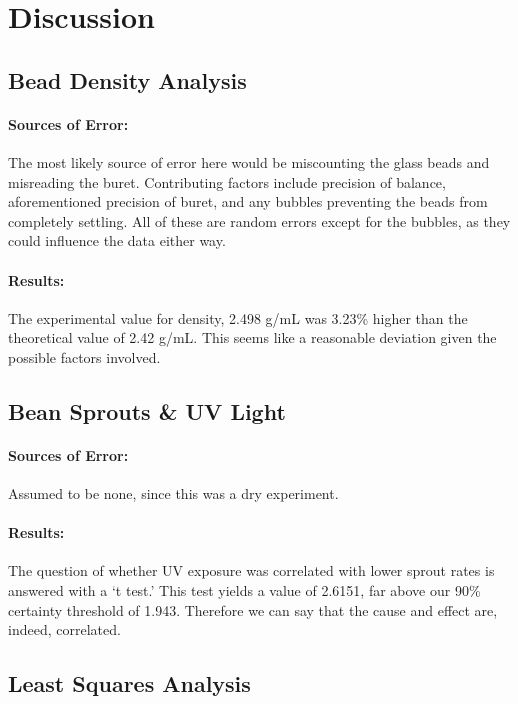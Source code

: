 \documentclass{article}
\begin{document}
\newpage

\section{Discussion}
    \subsection{Bead Density Analysis}
        \paragraph{Sources of Error: } The most likely source of error here would be miscounting the glass beads and misreading the buret. Contributing factors include precision of balance, aforementioned precision of buret, and any bubbles preventing the beads from completely settling. All of these are random errors except for the bubbles, as they could influence the data either way.
        \paragraph{Results: } The experimental value for density, 2.498 g/mL was 3.23\% higher than the theoretical value of 2.42 g/mL. This seems like a reasonable deviation given the possible factors involved. 
    \subsection{Bean Sprouts \& UV Light}
        \paragraph{Sources of Error: }Assumed to be none, since this was a dry experiment.
        \paragraph{Results: } The question of whether UV exposure was correlated with lower sprout rates is answered with a `t test.' This test yields a value of 2.6151, far above our 90\% certainty threshold of 1.943. Therefore we can say that the cause and effect are, indeed, correlated.
    \subsection{Least Squares Analysis}
\end{document}

